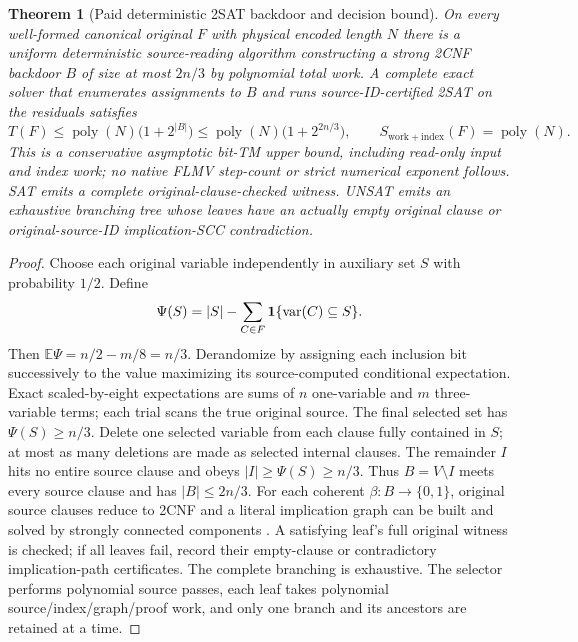 \documentclass[11pt]{article}
\newtheorem{theorem}{Theorem}
\begin{document}
\begin{theorem}[Paid deterministic 2SAT backdoor and decision bound]
On every well-formed canonical original $F$ with physical encoded length $N$ there is a uniform deterministic source-reading algorithm constructing a strong 2CNF backdoor $B$ of size at most $2n/3$ by polynomial total work. A complete exact solver that enumerates assignments to $B$ and runs source-ID-certified 2SAT on the residuals satisfies
\[
 T(F)\le \operatorname{poly}(N)\bigl(1+2^{|B|}\bigr)
 \le\operatorname{poly}(N)\bigl(1+2^{2n/3}\bigr),
 \qquad S_{\mathrm{work+index}}(F)=\operatorname{poly}(N).
\]
This is a conservative asymptotic bit-TM upper bound, including read-only input and index work; no native FLMV step-count or strict numerical exponent follows. SAT emits a complete original-clause-checked witness. UNSAT emits an exhaustive branching tree whose leaves have an actually empty original clause or original-source-ID implication-SCC contradiction.
\end{theorem}
\begin{proof}
Choose each original variable independently in auxiliary set $S$ with probability $1/2$. Define
\[
 \Psi(S)=|S|-\sum_{C\in F}{\bf1}\{\operatorname{var}(C)\subseteq S\}.
\]
Then $\mathbb E\Psi=n/2-m/8=n/3$. Derandomize by assigning each inclusion bit successively to the value maximizing its source-computed conditional expectation. Exact scaled-by-eight expectations are sums of $n$ one-variable and $m$ three-variable terms; each trial scans the true original source. The final selected set has $\Psi(S)\ge n/3$. Delete one selected variable from each clause fully contained in $S$; at most as many deletions are made as selected internal clauses. The remainder $I$ hits no entire source clause and obeys $|I|\ge\Psi(S)\ge n/3$. Thus $B=V\setminus I$ meets every source clause and has $|B|\le2n/3$. For each coherent $\beta:B\rightarrow\{0,1\}$, original source clauses reduce to 2CNF and a literal implication graph can be built and solved by strongly connected components \cite{apt1979}. A satisfying leaf's full original witness is checked; if all leaves fail, record their empty-clause or contradictory implication-path certificates. The complete branching is exhaustive. The selector performs polynomial source passes, each leaf takes polynomial source/index/graph/proof work, and only one branch and its ancestors are retained at a time. \end{proof}
\end{document}

